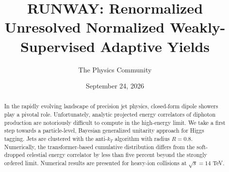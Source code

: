 \documentclass[11pt]{article}
\title{RUNWAY: Renormalized Unresolved Normalized Weakly-Supervised Adaptive Yields}
\author{The Physics Community}
\date{September 24, 2026}
\begin{document}
\maketitle
\begin{abstract}
In the rapidly evolving landscape of precision jet physics, closed-form
dipole showers play a pivotal role. Unfortunately, analytic projected
energy correlators of diphoton production are notoriously difficult to
compute in the high-energy limit. We take a first step towards a
particle-level, Bayesian generalized unitarity approach for Higgs
tagging. Jets are clustered with the anti-$k_T$ algorithm with radius $R
= 0.8$. Numerically, the transformer-based cumulative distribution
differs from the soft-dropped celestial energy correlator by less than
five percent beyond the strongly ordered limit. Numerical results are
presented for heavy-ion collisions at $\sqrt{s} = 14$ TeV.
\end{abstract}
\tableofcontents






\nocite{*}


\end{document}
